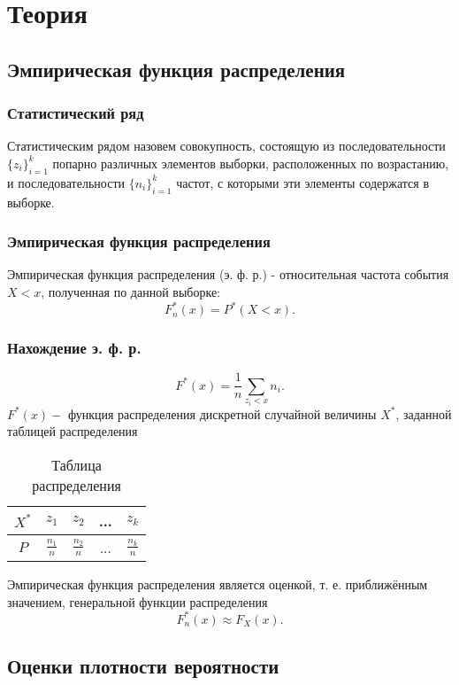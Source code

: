 \documentclass[a4paper,12pt]{article} %
\begin{document}
\section{Теория}
\subsection{Эмпирическая функция распределения}
\subsubsection{Статистический ряд}
Статистическим рядом назовем совокупность, состоящую из последовательности $\displaystyle\{z_i\}_{i=1}^k$ попарно различных элементов выборки, расположенных по возрастанию, и последовательности $\displaystyle\{n_i\}_{i=1}^k$ частот, с которыми эти элементы содержатся в выборке.
\subsubsection{Эмпирическая функция распределения}
Эмпирическая функция распределения (э. ф. р.) - относительная частота события $X < x$, полученная по данной выборке:
\begin{equation}
    F_n^*(x)=P^*(X<x).
\end{equation}
\subsubsection{Нахождение э. ф. р.}
\begin{equation}
    F^*(x)=\frac{1}{n}\sum_{z_i<x}n_i.
\end{equation}
$F^*(x)-$ функция распределения дискретной случайной величины $X^*$, заданной таблицей распределения
\begin{table}[H]
    \centering
    \begin{tabular}{|c|c|c|c|c|}
        \hline
         $X^*$&$z_1$&$z_2$&...&$z_k$\\
         \hline
         $P$&$\frac{n_1}{n}$&$\frac{n_2}{n}$&...&$\frac{n_k}{n}$\\
         \hline
    \end{tabular}
    \caption{Таблица распределения}
    \label{tab:my_label}
\end{table}
Эмпирическая функция распределения является оценкой, т. е. приближённым значением, генеральной функции распределения
\begin{equation}
    F_n^*(x)\approx F_X(x).
\end{equation}
\subsection{Оценки плотности вероятности}
\end{document}
